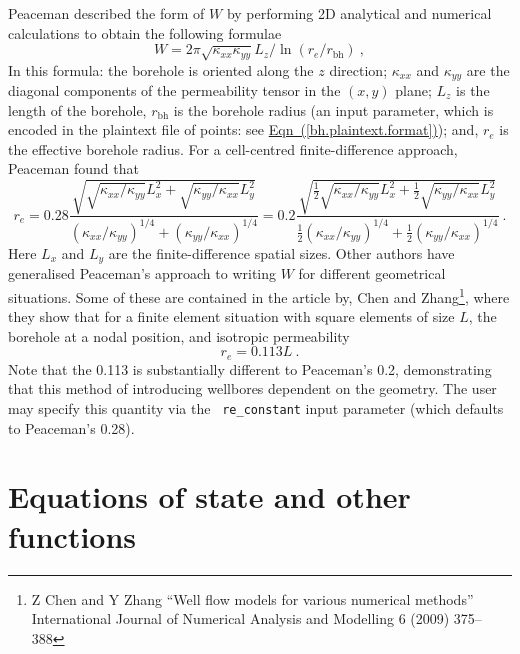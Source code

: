 \documentclass[12pt]{report}
\begin{document}
Peaceman described the form of $W$ by performing
2D analytical and numerical calculations to obtain the following
formulae
\begin{equation}
W = 2\pi \sqrt{\kappa_{xx}\kappa_{yy}}L_{z}/\ln(r_{e}/r_{\mathrm{bh}})
\ ,
\end{equation}
In this formula: the borehole is oriented along the $z$ direction;
$\kappa_{xx}$ and $\kappa_{yy}$ are the diagonal components of the
permeability tensor in the $(x,y)$ plane; $L_{z}$ is the length of the
borehole, $r_{\mathrm{bh}}$ is the borehole radius (an input
parameter, which is encoded in the plaintext file of points: see
\hyperref[bh.plaintext.format]{Eqn~(\ref*{bh.plaintext.format})});
and, $r_{e}$ is the effective borehole radius.  For a cell-centred
finite-difference approach, Peaceman found that
\begin{equation}
r_{e} = 0.28 \frac{\sqrt{\sqrt{\kappa_{xx}/\kappa_{yy}}L_{x}^{2} +
    \sqrt{\kappa_{yy}/\kappa_{xx}}L_{y}^{2}}}{(\kappa_{xx}/\kappa_{yy})^{1/4}
  + (\kappa_{yy}/\kappa_{xx})^{1/4}}
= 0.2 \frac{\sqrt{\mbox{$\frac{1}{2}$}\sqrt{\kappa_{xx}/\kappa_{yy}}L_{x}^{2} +
    \mbox{$\frac{1}{2}$}\sqrt{\kappa_{yy}/\kappa_{xx}}L_{y}^{2}}}{\mbox{$\frac{1}{2}$}(\kappa_{xx}/\kappa_{yy})^{1/4}
  + \mbox{$\frac{1}{2}$}(\kappa_{yy}/\kappa_{xx})^{1/4}} \ .
\end{equation}
Here $L_{x}$ and $L_{y}$ are the finite-difference spatial sizes.
Other authors have generalised Peaceman's approach to writing $W$ for
different geometrical situations.  Some of these are contained in the
article by, Chen and Zhang\footnote{Z Chen and Y Zhang ``Well flow models for various
  numerical methods'' International Journal of Numerical Analysis and
  Modelling 6 (2009) 375--388}, where they show that for a
finite element situation with square elements of size $L$, the
borehole at a nodal position, and isotropic permeability
\begin{equation}
r_{e} =  0.113L \ .
\end{equation}
Note that the 0.113 is substantially different to Peaceman's 0.2,
demonstrating that this method of introducing wellbores dependent on
the geometry.  The user may specify this quantity via the {\tt
  re\_constant} input parameter (which defaults to Peaceman's 0.28).






\chapter{Equations of state and other functions}
\label{eos}
\end{document}
